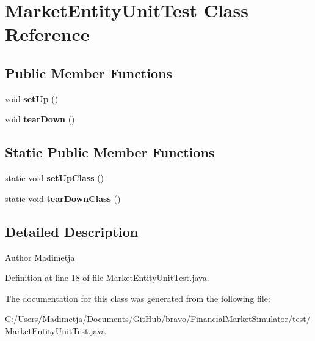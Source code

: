 \hypertarget{class_market_entity_unit_test}{\section{Market\+Entity\+Unit\+Test Class Reference}
\label{class_market_entity_unit_test}
}
\subsection*{Public Member Functions}
\begin{DoxyCompactItemize}
\item 
\hypertarget{class_market_entity_unit_test_a146492fa14011135db8b95abaeb1fe48}{void {\bfseries set\+Up} ()}\label{class_market_entity_unit_test_a146492fa14011135db8b95abaeb1fe48}

\item 
\hypertarget{class_market_entity_unit_test_abaa756813805984bc9dd42799d2712c4}{void {\bfseries tear\+Down} ()}\label{class_market_entity_unit_test_abaa756813805984bc9dd42799d2712c4}

\end{DoxyCompactItemize}
\subsection*{Static Public Member Functions}
\begin{DoxyCompactItemize}
\item 
\hypertarget{class_market_entity_unit_test_a55db93367ff6381d89024a48ab61b7e3}{static void {\bfseries set\+Up\+Class} ()}\label{class_market_entity_unit_test_a55db93367ff6381d89024a48ab61b7e3}

\item 
\hypertarget{class_market_entity_unit_test_a0fc27471ace003490b7088fd122a73a8}{static void {\bfseries tear\+Down\+Class} ()}\label{class_market_entity_unit_test_a0fc27471ace003490b7088fd122a73a8}

\end{DoxyCompactItemize}


\subsection{Detailed Description}
\begin{DoxyAuthor}{Author}
Madimetja 
\end{DoxyAuthor}


Definition at line 18 of file Market\+Entity\+Unit\+Test.\+java.



The documentation for this class was generated from the following file\+:\begin{DoxyCompactItemize}
\item 
C\+:/\+Users/\+Madimetja/\+Documents/\+Git\+Hub/bravo/\+Financial\+Market\+Simulator/test/Market\+Entity\+Unit\+Test.\+java\end{DoxyCompactItemize}
